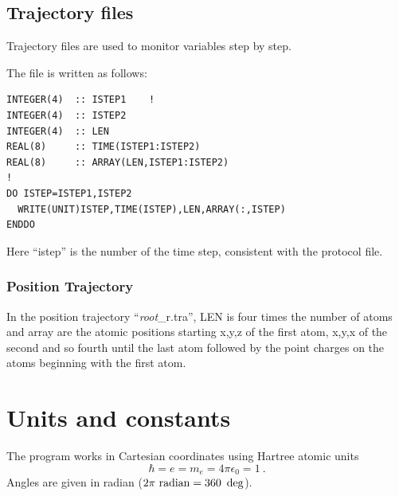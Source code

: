 \documentclass[final,12pt]{article}
\begin{document}
\subsection{Trajectory files}
Trajectory files are used to monitor variables step by step. 

The file is written as follows:
\begin{verbatim}
INTEGER(4)  :: ISTEP1    !
INTEGER(4)  :: ISTEP2
INTEGER(4)  :: LEN
REAL(8)     :: TIME(ISTEP1:ISTEP2)
REAL(8)     :: ARRAY(LEN,ISTEP1:ISTEP2)
!
DO ISTEP=ISTEP1,ISTEP2
  WRITE(UNIT)ISTEP,TIME(ISTEP),LEN,ARRAY(:,ISTEP)
ENDDO
\end{verbatim}

Here ``istep'' is the number of the time step, consistent with the
protocol file. 

\subsubsection{Position Trajectory}
In the position trajectory ``{\it root}\_r.tra'', LEN is four times the number of
atoms and array are the atomic positions starting x,y,z of the first
atom, x,y,x of the second and so fourth until the last atom followed
by the point charges on the atoms beginning with the first atom.



\newpage
\section{Units and constants}
\label{constants}

The program works in Cartesian coordinates using Hartree atomic units
\begin{equation}
\hbar=e=m_e=4\pi\epsilon_0=1 \ .
\end{equation}
Angles are given in radian ($2\pi~{\rm radian}=360~\deg$).
\end{document}
